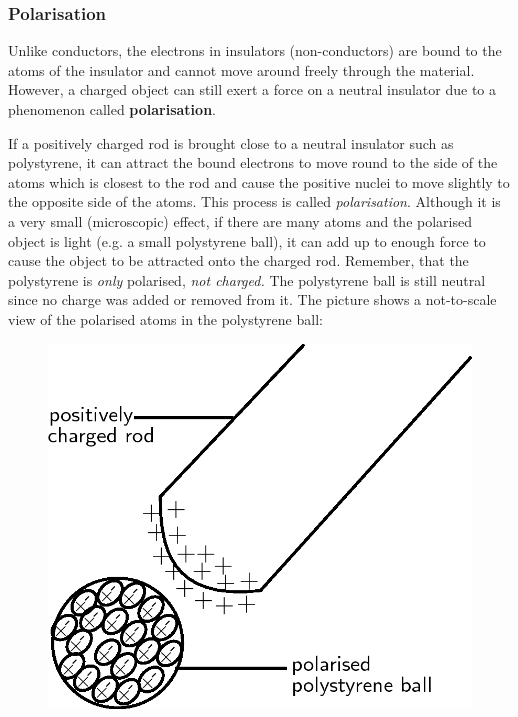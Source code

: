             \subsubsection{ Polarisation}
            \nopagebreak
            \label{m38780*id201876}Unlike conductors, the electrons in insulators (non-conductors) are bound to the atoms of the
insulator and cannot move around freely through the material. However, a charged object can still
exert a force on a neutral insulator due to a phenomenon called \textbf{polarisation}.\par 
        \label{m38780*id201887}If a positively charged rod is
brought close to a neutral insulator such as polystyrene, it can attract the bound electrons
to move round to the
side of the atoms which is closest to the rod and cause the positive nuclei to move slightly
to the opposite side of the atoms. This process is called \textsl{polarisation}. Although
it is a very small (microscopic) effect, if there are many atoms and the polarised object is
light (e.g. a small polystyrene ball), it can add up to enough force to cause the object to be attracted onto the
charged rod. Remember, that the polystyrene
is \textsl{only} polarised, \textsl{not charged.}
The polystyrene ball is still neutral since no charge was added or removed from it.
The picture shows
a not-to-scale view of the polarised atoms in the polystyrene ball:\par 
        \label{m38780*id201914}
    \setcounter{subfigure}{0}
	\begin{figure}[H] %
    \begin{center}
    \label{m38780*id201917!!!underscore!!!media}\label{m38780*id201917!!!underscore!!!printimage}\includegraphics{col11305.imgs/m38780_PG10C8_011.png} %
      \vspace{2pt}
    \vspace{.1in}
    \end{center}
 \end{figure}       
